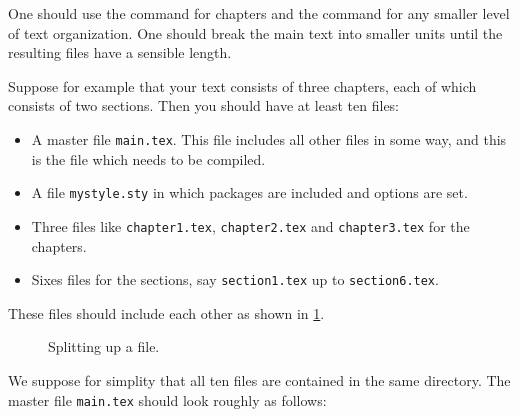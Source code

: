 One should use the  command for chapters and the  command for any smaller level of text organization.
One should break the main text into smaller units until the resulting files have a sensible length.

Suppose for example that your text consists of three chapters, each of which consists of two sections.
Then you should have at least ten files:
\begin{itemize}
  \item
    A master file \texttt{main.tex}.
    This file includes all other files in some way, and this is the file which needs to be compiled.
  \item
    A file \texttt{mystyle.sty} in which packages are included and options are set.
  \item
    Three files like \texttt{chapter1.tex}, \texttt{chapter2.tex} and \texttt{chapter3.tex} for the chapters.
  \item
    Sixes files for the sections, say \texttt{section1.tex} up to \texttt{section6.tex}.
\end{itemize}
These files should include each other as shown in \cref{file inclusion structure}.
\begin{figure}[tb]
  \begin{center}
  \end{center}
  \caption{Splitting up a file.}
  \label{file inclusion structure}
\end{figure}
We suppose for simplity that all ten files are contained in the same directory.
The master file \texttt{main.tex} should look roughly as follows:
%
